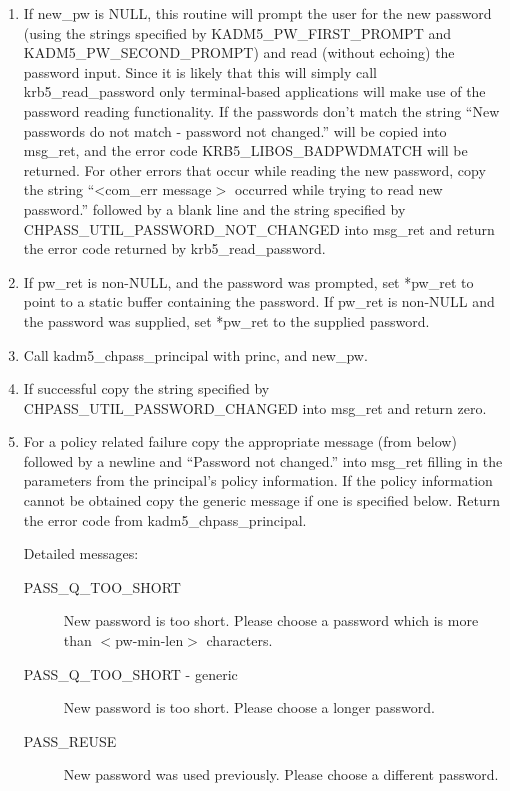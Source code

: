 \begin{enumerate}
\item If new_pw is NULL, this routine will prompt the user for the new
password (using the strings specified by KADM5_PW_FIRST_PROMPT and
KADM5_PW_SECOND_PROMPT) and read (without echoing) the password input.
Since it is likely that this will simply call krb5_read_password only
terminal-based applications will make use of the password reading
functionality. If the passwords don't match the string ``New passwords do
not match - password not changed.'' will be copied into msg_ret, and the
error code KRB5_LIBOS_BADPWDMATCH will be returned.  For other errors that
occur while reading the new password, copy the string ``<com_err message$>$
occurred while trying to read new password.'' followed by a blank line and
the string specified by CHPASS_UTIL_PASSWORD_NOT_CHANGED into msg_ret and
return the error code returned by krb5_read_password.

\item If pw_ret is non-NULL, and the password was prompted, set *pw_ret to
point to a static buffer containing the password.  If pw_ret is non-NULL
and the password was supplied, set *pw_ret to the supplied password.

\item Call kadm5_chpass_principal with princ, and new_pw.

\item If successful copy the string specified by CHPASS_UTIL_PASSWORD_CHANGED
into msg_ret and return zero.

\item For a policy related failure copy the appropriate message (from below)
followed by a newline and ``Password not changed.'' into msg_ret
filling in the parameters from the principal's policy information. If
the policy information cannot be obtained copy the generic message if
one is specified below. Return the error code from
kadm5_chpass_principal.

Detailed messages:
\begin{description}

\item[PASS_Q_TOO_SHORT]
New password is too short. Please choose a
password which is more than $<$pw-min-len$>$ characters.

\item[PASS_Q_TOO_SHORT - generic]
New password is too short. Please choose a longer password.

\item[PASS_REUSE]
New password was used previously. Please choose a
different password.


\end{description}
\end{enumerate}
